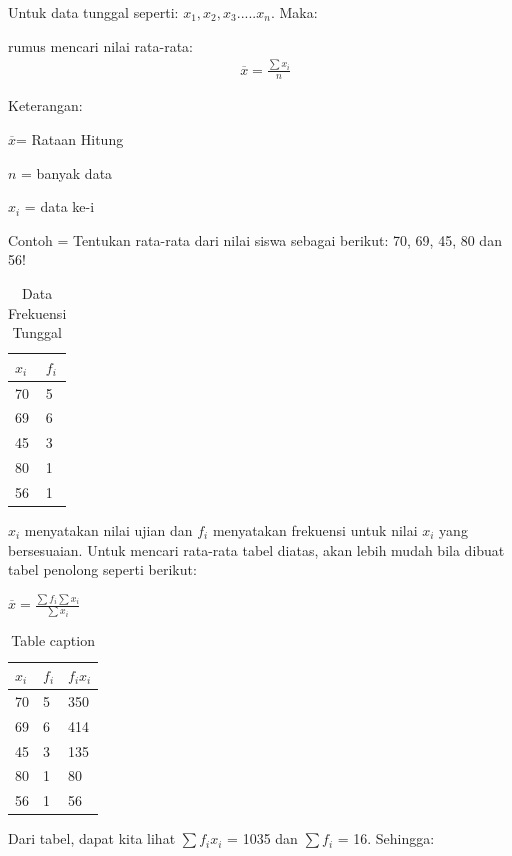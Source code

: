 \documentclass[11pt,fleqn]{book} %
\begin{document}
{Untuk data tunggal seperti: $x_{1}, x_{2}, x_{3}.....x_{n} $. Maka:

\begin{theorem}[Mean]
rumus mencari nilai rata-rata:
\begin{align}
& \overline{x} = \frac{\sum x_{i}}{n}
\end{align}
\end{theorem}

Keterangan:
	 
$\overline{x}$= Rataan Hitung
		 
$n$ = banyak data 

$x_{i}$ = data ke-i

Contoh = Tentukan rata-rata dari nilai siswa sebagai berikut: 70, 69, 45, 80 dan 56!

\begin{table}[h]
\centering
\begin{tabular}{l l}
\toprule
\textbf{$x_{i}$} & \textbf{$f_{i}$}\\
\midrule
70 & 5 \\
69 & 6 \\
45 & 3 \\
80 & 1 \\
56 & 1 \\
\bottomrule
\end{tabular}
\caption{Data Frekuensi Tunggal}
\end{table}

$x_{i}$ menyatakan nilai ujian dan $f_{i}$ menyatakan frekuensi untuk nilai $x_{i}$ yang bersesuaian. Untuk mencari rata-rata tabel diatas, akan lebih mudah bila dibuat tabel penolong seperti berikut:


$\overline{x} = \frac{\sum f_{i}\sum x_{i}}{\sum x_{i}}$


\begin{table}[h]
\centering
\begin{tabular}{l l l}
\toprule
\textbf{$x_{i}$} & \textbf{$f_{i}$} & \textbf{$f_{i}x_{i}$}\\
\midrule
70 & 5 & 350 \\
69 & 6 & 414\\
45 & 3 & 135\\
80 & 1 & 80\\
56 & 1 & 56\\
\bottomrule
\end{tabular}
\caption{Table caption}
\end{table}

Dari tabel, dapat kita lihat $\sum f_{i}x_{i}$  = 1035 dan $\sum f_{i}$  = 16. Sehingga:

}
\end{document}
